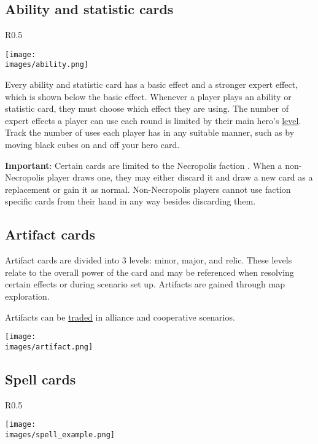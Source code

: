 \clearpage
\subsection*{\hypertarget{Ability}{Ability and statistic cards}}
\begin{wrapfigure}{R}{0.5\textwidth}

    \texttt{[image: \\images/ability.png]}

\end{wrapfigure}

Every ability and statistic card has a basic effect and a stronger expert effect, which is shown below the basic effect. Whenever a player plays an ability or statistic card, they must choose which effect they are using. The number of expert  effects a player can use each round is limited by their main hero’s \hyperlink{Level}{level}. Track the number of uses each player has in any suitable manner, such as by moving black cubes on and off your hero card.\par
\textbf{Important}: Certain cards are limited to the Necropolis faction . When a non-Necropolis player draws one, they may either discard it and draw a new card as a replacement or gain it as normal. Non-Necropolis players cannot use faction specific cards from their hand in any way besides discarding them.

\subsection*{Artifact cards}
Artifact cards are divided into 3 levels: minor, major, and relic. These levels relate to the overall power of the card and may be referenced when resolving certain effects or during scenario set up. Artifacts are gained through map exploration.\par
Artifacts can be \hyperlink{Trading}{traded} in alliance and cooperative scenarios.\par
\texttt{[image: \\images/artifact.png]}


\clearpage

\subsection*{\hypertarget{spells}{Spell cards}}
\begin{wrapfigure}{R}{0.5\textwidth}
    \begin{center}
    \texttt{[image: \\images/spell\_example.png]}
    \end{center}
\end{wrapfigure}

